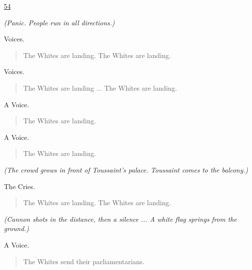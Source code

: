 \documentclass[letterpaper,article,12pt,oneside,notitlepage]{memoir}
\begin{document}
\href{http://cesaire.elotroalex.com/chiens/chiens/p054.html}{54}

\textit{(Panic. People run in all directions.)}

\begin{center}Voices.\end{center}

\begin{verse}
The Whites are landing. The Whites are landing. \\
\end{verse}

\begin{center}Voices.\end{center}

\begin{verse}
The Whites are landing ... The Whites are landing. \\
\end{verse}

\begin{center}A Voice.\end{center}

\begin{verse}
The Whites are landing. \\
\end{verse}

\begin{center}A Voice.\end{center}

\begin{verse}
The Whites are landing. \\
\end{verse}

\textit{(The crowd grows in front of Toussaint's palace. Toussaint comes to the balcony.)}

\begin{center}The Cries.\end{center}

\begin{verse}
The Whites are landing. The Whites are landing. \\
\end{verse}

\textit{(Cannon shots in the distance, then a silence ... A white flag springs from the ground.)}

\begin{center}A Voice.\end{center}

\begin{verse}
The Whites send their parliamentarians. \\
\end{verse}
\end{document}

